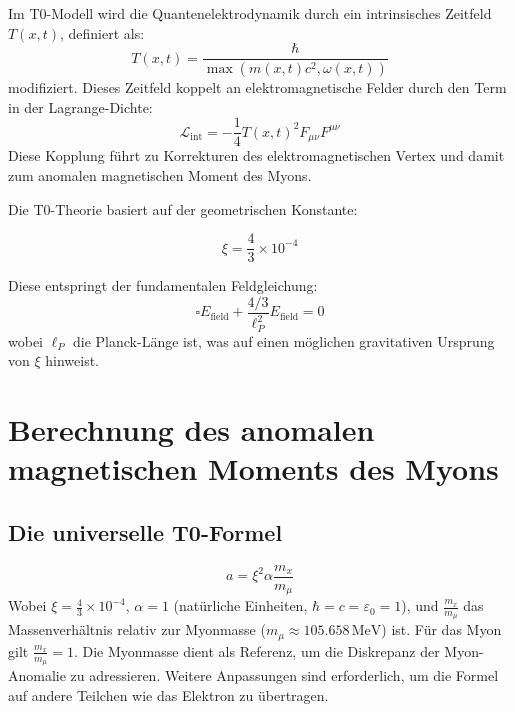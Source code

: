\documentclass[12pt,a4paper]{article}
\newcommand{\Tfield}{T(x,t)}
\newcommand{\calL}{\mathcal{L}}
\newcommand{\xipar}{\xi}
\begin{document}
	Im T0-Modell wird die Quantenelektrodynamik durch ein intrinsisches Zeitfeld \(\Tfield\), definiert als:
	\begin{equation}
		\Tfield = \frac{\hbar}{\max(m(x,t)c^2, \omega(x,t))}
	\end{equation}
	modifiziert. Dieses Zeitfeld koppelt an elektromagnetische Felder durch den Term in der Lagrange-Dichte:
	\begin{equation}
		\calL_{\text{int}} = -\frac{1}{4} \Tfield^2 F_{\mu\nu} F^{\mu\nu}
	\end{equation}
	Diese Kopplung führt zu Korrekturen des elektromagnetischen Vertex und damit zum anomalen magnetischen Moment des Myons.
	
	Die T0-Theorie basiert auf der geometrischen Konstante:
	\begin{formel}
		\begin{equation}
			\xipar = \frac{4}{3} \times 10^{-4}
		\end{equation}
	\end{formel}
	Diese entspringt der fundamentalen Feldgleichung:
	\begin{equation}
		\square E_{\text{field}} + \frac{4/3}{\ell_P^2} E_{\text{field}} = 0
	\end{equation}
	wobei \(\ell_P\) die Planck-Länge ist, was auf einen möglichen gravitativen Ursprung von \(\xipar\) hinweist.
	
	\section{Berechnung des anomalen magnetischen Moments des Myons}
	
	\subsection{Die universelle T0-Formel}
	
	\begin{formel}
		\begin{equation}
			a = \xipar^2 \alpha \frac{m_x}{m_\mu}
		\end{equation}
		Wobei \(\xipar = \frac{4}{3} \times 10^{-4}\), \(\alpha = 1\) (natürliche Einheiten, \(\hbar = c = \varepsilon_0 = 1\)), und \(\frac{m_x}{m_\mu}\) das Massenverhältnis relativ zur Myonmasse (\(m_\mu \approx 105.658 \, \text{MeV}\)) ist. Für das Myon gilt \(\frac{m_x}{m_\mu} = 1\). Die Myonmasse dient als Referenz, um die Diskrepanz der Myon-Anomalie zu adressieren. Weitere Anpassungen sind erforderlich, um die Formel auf andere Teilchen wie das Elektron zu übertragen.
	\end{formel}
	
\end{document}
